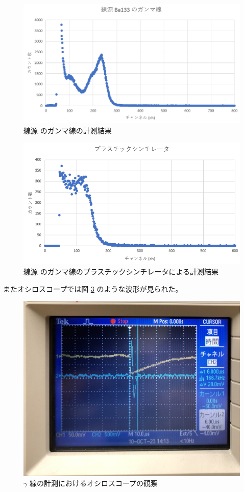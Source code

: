 \documentclass[uplatex,dvipdfmx,a4paper,11pt]{jlreq}
\numberwithin{equation}{section}
\theoremstyle{definition}
\begin{document}
\begin{figure}[htbp]
  \centering
  \includegraphics[width=12cm]{./assets/Ba133_gamma.png}
  \caption{線源  のガンマ線の計測結果}
  \label{fig:Ba133 gamma}
\end{figure}
\begin{figure}[htbp]
  \centering
  \includegraphics[width=12cm]{./assets/plastic.png}
  \caption{線源  のガンマ線のプラスチックシンチレータによる計測結果}
  \label{fig:Ba133 plastic}
\end{figure}

またオシロスコープでは図 \ref{fig:trigger 2} のような波形が見られた。
\begin{figure}[htbp]
  \centering
  \includegraphics[width=12cm]{./assets/trigger2.jpg}
  \caption{$\gamma$ 線の計測におけるオシロスコープの観察}
  \label{fig:trigger 2}
\end{figure}
\end{document}
